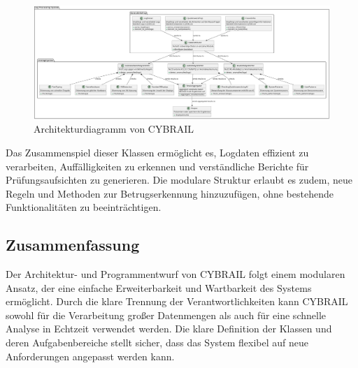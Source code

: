 \begin{landscape}
\begin{figure}[h]
    \centering
    \includegraphics[width=1.5\textwidth]{figures/CybrailClassdiagramm.pdf}
    \caption{Architekturdiagramm von CYBRAIL}
    \label{fig:architekturdiagramm}
\end{figure}
\end{landscape}

Das Zusammenspiel dieser Klassen ermöglicht es, Logdaten effizient zu verarbeiten, Auffälligkeiten zu erkennen und verständliche Berichte für Prüfungsaufsichten zu generieren. 
Die modulare Struktur erlaubt es zudem, neue Regeln und Methoden zur Betrugserkennung hinzuzufügen, ohne bestehende Funktionalitäten zu beeinträchtigen.

\subsection{Zusammenfassung}

Der Architektur- und Programmentwurf von CYBRAIL folgt einem modularen Ansatz, der eine einfache Erweiterbarkeit und Wartbarkeit des Systems ermöglicht. Durch die klare Trennung der Verantwortlichkeiten kann CYBRAIL sowohl für die Verarbeitung großer Datenmengen als auch für eine schnelle Analyse in Echtzeit verwendet werden. Die klare Definition der Klassen und deren Aufgabenbereiche stellt sicher, dass das System flexibel auf neue Anforderungen angepasst werden kann.
